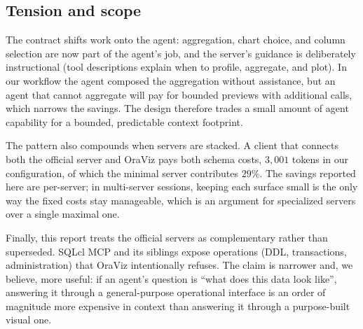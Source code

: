 \subsection{Tension and scope}

The contract shifts work onto the agent: aggregation, chart choice, and column selection are now part of the agent's job, and the server's guidance is deliberately instructional (tool descriptions explain when to profile, aggregate, and plot). In our workflow the agent composed the aggregation without assistance, but an agent that cannot aggregate will pay for bounded previews with additional calls, which narrows the savings. The design therefore trades a small amount of agent capability for a bounded, predictable context footprint.

The pattern also compounds when servers are stacked. A client that connects both the official server and OraViz pays both schema costs, $3{,}001$ tokens in our configuration, of which the minimal server contributes $29$\%. The savings reported here are per-server; in multi-server sessions, keeping each surface small is the only way the fixed costs stay manageable, which is an argument for specialized servers over a single maximal one.

Finally, this report treats the official servers as complementary rather than superseded. SQLcl MCP and its siblings expose operations (DDL, transactions, administration) that OraViz intentionally refuses. The claim is narrower and, we believe, more useful: if an agent's question is ``what does this data look like'', answering it through a general-purpose operational interface is an order of magnitude more expensive in context than answering it through a purpose-built visual one.
